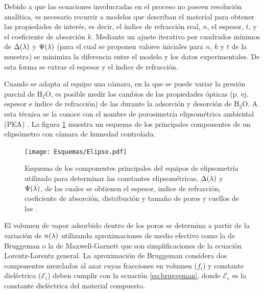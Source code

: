 		Debido a que las ecuaciones involucradas en el proceso no poseen resolución analítica, es necesario recurrir a modelos que describan el material para obtener las propiedades de interés, es decir, el índice de refracción real, $n$, el espesor, $t$, y el coeficiente de absorción $k$. Mediante un ajuste iterativo por cuadrados mínimos de $\Delta(\lambda\index{longitud de onda})$ y $\Psi(\lambda\index{longitud de onda})$ (para el cual se proponen valores iniciales para $n$, $k$ y $t$ de la muestra) se minimiza la diferencia entre el modelo y los datos experimentales. De esta forma se extrae el espesor y el índice de refracción. \cite{TompkinsHarlandG.1999}

		Cuando se adapta al equipo una cámara, en la que se puede variar la presión parcial de H$_2$O, es posible medir los cambios de las propiedades ópticas (p. ej. espesor e índice de refracción) de las \pdm\space durante la adsorción y desorción de H$_2$O. A esta técnica se la conoce con el nombre de porosimetría elipsométrica ambiental (PEA) \cite{Boissiere2005}. La figura \ref{fig:elipso} muestra un esquema de los principales componentes de un elipsómetro con cámara de humedad controlada.

			  \begin{figure}[h]
				\begin{center}
				\texttt{[image: Esquemas/Elipso.pdf]}
			  	\caption[Esquema de la técncia de elipsoporosimetría ambiental]{Esquema de los componentes principales del equipos de elipsometría utilizado para determinar las constantes elipsométricas, $\Delta(\lambda\index{longitud de onda})$ y $\Psi(\lambda\index{longitud de onda})$, de las cuales se obtienen el espesor, indice de refracción, coeficiente de absorción,  distribución y tamaño de poros y cuellos de las \pdm.}
			  	\label{fig:elipso}
			  	\end{center}
			  	\end{figure}
		
		El volumen de vapor adsorbido dentro de los poros se determina a partir de la variación de $n(\lambda\index{longitud de onda})$ utilizando aproximaciones de medio efectivo como la de Bruggeman\cite{Bruggeman1935} o la de Maxwell-Garnett\cite{Garnett1906} que son simplificaciones de la ecuación Lorentz-Lorentz  general\cite{TompkinsHarlandG.1999}.
		La aproximación de Bruggeman considera dos componentes mezclados al azar cuyas fracciones en volumen ($f_i$) y constante dieléctrica ($\mathcal{E}_i$) deben cumplir con la ecuación \ref{eq:bruggeman}, donde $\mathcal{E}_e$ es la constante dieléctrica del material compuesto. 
				
